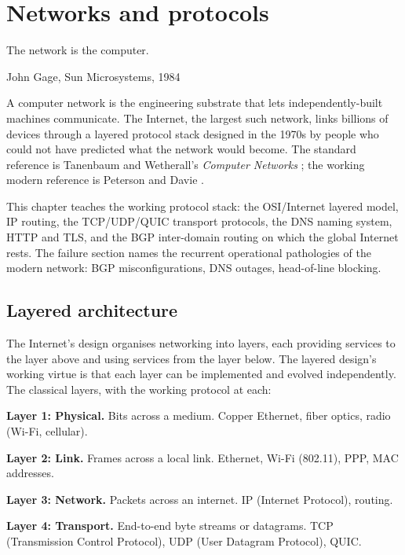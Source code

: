 \chapter{Networks and protocols}
\label{vol07:ch10}

\epigraph{The network is the computer.}{John Gage, Sun Microsystems, 1984}


\noindent
A computer network is the engineering substrate that lets independently-built machines communicate. The Internet, the largest such network, links billions of devices through a layered protocol stack designed in the 1970s by people who could not have predicted what the network would become. The standard reference is Tanenbaum and Wetherall's \emph{Computer Networks} \cite{text:tanenbaum-networks}; the working modern reference is Peterson and Davie \cite{text:peterson-davie}.

This chapter teaches the working protocol stack: the OSI/Internet layered model, IP routing, the TCP/UDP/QUIC transport protocols, the DNS naming system, HTTP and TLS, and the BGP inter-domain routing on which the global Internet rests. The failure section names the recurrent operational pathologies of the modern network: BGP misconfigurations, DNS outages, head-of-line blocking.

\section{Layered architecture}

The Internet's design organises networking into layers, each providing services to the layer above and using services from the layer below. The layered design's working virtue is that each layer can be implemented and evolved independently. The classical layers, with the working protocol at each:

\textbf{Layer 1: Physical.} Bits across a medium. Copper Ethernet, fiber optics, radio (Wi-Fi, cellular).

\textbf{Layer 2: Link.} Frames across a local link. Ethernet, Wi-Fi (802.11), PPP, MAC addresses.

\textbf{Layer 3: Network.} Packets across an internet. IP (Internet Protocol), routing.

\textbf{Layer 4: Transport.} End-to-end byte streams or datagrams. TCP (Transmission Control Protocol), UDP (User Datagram Protocol), QUIC.

